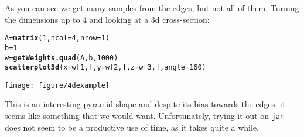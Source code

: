\documentclass{article}\usepackage{graphicx, color}
\makeatletter
\def\maxwidth{ %
  \ifdim\Gin@nat@width>\linewidth
    \linewidth
  \else
    \Gin@nat@width
  \fi
}
\newcommand{\hlfunctioncall}[1]{\textcolor[rgb]{0.501960784313725,0,0.329411764705882}{\textbf{#1}}}%
\newenvironment{kframe}{%
 \def\at@end@of@kframe{}%
 \ifinner\ifhmode%
  \def\at@end@of@kframe{\end{minipage}}%
  \begin{minipage}{\columnwidth}%
 \fi\fi%
 \def\FrameCommand##1{\hskip\@totalleftmargin \hskip-\fboxsep
 \colorbox{shadecolor}{##1}\hskip-\fboxsep
     \hskip-\linewidth \hskip-\@totalleftmargin \hskip\columnwidth}%
 \MakeFramed {\advance\hsize-\width
   \@totalleftmargin\z@ \linewidth\hsize
   \@setminipage}}%
 {\par\unskip\endMakeFramed%
 \at@end@of@kframe}
\newenvironment{knitrout}{}{} %
\makeatother
\begin{document}
As you can see we get many samples from the edges, but not all of
them. Turning the dimensions up to 4 and looking at a 3d cross-section:

\begin{knitrout}
\color{fgcolor}\begin{kframe}
\begin{alltt}
A = \hlfunctioncall{matrix}(1, ncol = 4, nrow = 1)
b = 1
w = \hlfunctioncall{getWeights.quad}(A, b, 1000)
\hlfunctioncall{scatterplot3d}(x = w[1, ], y = w[2, ], z = w[3, ], angle = 160)
\end{alltt}
\end{kframe}
\texttt{[image: figure/4dexample]} 

\end{knitrout}


This is an interesting pyramid shape and despite its bias towards the
edges, it seems like something that we would want. Unfortunately,
trying it out on \verb+jan+ does not seem to be a productive use of
time, as it takes quite a while.
\end{document}
